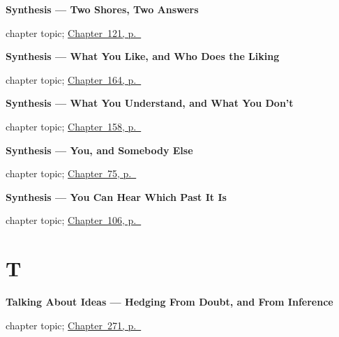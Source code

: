 \noindent\begin{minipage}[t]{\linewidth}
\raggedright
\textbf{Synthesis --- Two Shores, Two Answers}\par
\footnotesize chapter topic; \hyperref[ch:synthesis-perfect]{Chapter~121, p.~\pageref*{ch:synthesis-perfect}}
\end{minipage}\par\smallskip

\noindent\begin{minipage}[t]{\linewidth}
\raggedright
\textbf{Synthesis --- What You Like, and Who Does the Liking}\par
\footnotesize chapter topic; \hyperref[ch:spanish-synthesis-gustar]{Chapter~164, p.~\pageref*{ch:spanish-synthesis-gustar}}
\end{minipage}\par\smallskip

\noindent\begin{minipage}[t]{\linewidth}
\raggedright
\textbf{Synthesis --- What You Understand, and What You Don't}\par
\footnotesize chapter topic; \hyperref[ch:spanish-synthesis-verbs-of-mind]{Chapter~158, p.~\pageref*{ch:spanish-synthesis-verbs-of-mind}}
\end{minipage}\par\smallskip

\noindent\begin{minipage}[t]{\linewidth}
\raggedright
\textbf{Synthesis --- You, and Somebody Else}\par
\footnotesize chapter topic; \hyperref[ch:spanish-synthesis-yo-go]{Chapter~75, p.~\pageref*{ch:spanish-synthesis-yo-go}}
\end{minipage}\par\smallskip

\noindent\begin{minipage}[t]{\linewidth}
\raggedright
\textbf{Synthesis --- You Can Hear Which Past It Is}\par
\footnotesize chapter topic; \hyperref[ch:spanish-synthesis-preterito]{Chapter~106, p.~\pageref*{ch:spanish-synthesis-preterito}}
\end{minipage}\par\smallskip

\section*{T}

\noindent\begin{minipage}[t]{\linewidth}
\raggedright
\textbf{Talking About Ideas --- Hedging From Doubt, and From Inference}\par
\footnotesize chapter topic; \hyperref[ch:ideas]{Chapter~271, p.~\pageref*{ch:ideas}}
\end{minipage}\par\smallskip

